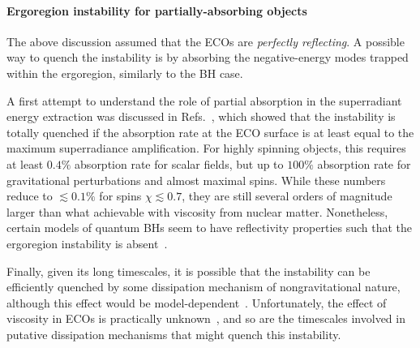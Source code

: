 \documentclass[11pt]{article}
\numberwithin{equation}{section} %
\begin{document}
\paragraph{Ergoregion instability for partially-absorbing objects} \label{sec:ERpartial}
%  
The above discussion assumed that the ECOs are \emph{perfectly reflecting}.
A possible way to quench the instability is by absorbing the negative-energy modes trapped within the ergoregion, 
similarly to the BH case.
%

A first attempt to understand the role of partial absorption in the superradiant energy extraction was discussed in 
Refs.~\cite{Maggio:2017ivp,Maggio:2018ivz}, which showed that the instability is totally quenched if the absorption 
rate at the ECO surface is at least equal to the maximum superradiance amplification. For highly spinning 
objects, this
requires at least $0.4\%$ absorption rate for scalar fields, but up to $100\%$ absorption rate for
gravitational perturbations and almost maximal spins. While these numbers
reduce to $\lesssim 0.1\%$ for spins $\chi\lesssim0.7$, they are still several orders of magnitude larger than
what achievable with viscosity from nuclear matter. 
%
Nonetheless, certain models of quantum BHs seem to have reflectivity properties such that the ergoregion instability is 
absent~\cite{Wang:2019rcf,Oshita:2019sat}.



Finally, given its long timescales, it is possible that the instability can be efficiently quenched by some dissipation 
mechanism of nongravitational nature, although this effect would be 
model-dependent~\cite{Maggio:2017ivp,Maggio:2018ivz}. 
%
Unfortunately, the effect of viscosity in ECOs is practically unknown~\cite{Cardoso:2014sna,Guo:2017jmi},
and so are the timescales involved in putative dissipation mechanisms that might quench this instability. 
\end{document}
